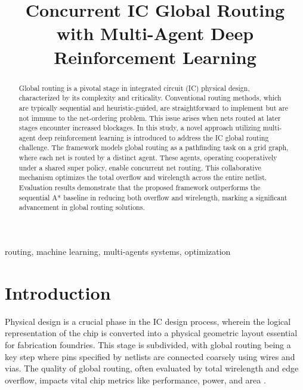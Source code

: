 \documentclass[conference]{IEEEtran}
\begin{document}
\title{Concurrent IC Global Routing with Multi-Agent Deep Reinforcement Learning}

\author{
}

\maketitle

\begin{abstract}
    Global routing is a pivotal stage in integrated circuit (IC) physical design, characterized by its complexity and criticality. Conventional routing methods, which are typically sequential and heuristic-guided, are straightforward to implement but are not immune to the net-ordering problem. This issue arises when nets routed at later stages encounter increased blockages. In this study, a novel approach utilizing multi-agent deep reinforcement learning is introduced to address the IC global routing challenge. The framework models global routing as a pathfinding task on a grid graph, where each net is routed by a distinct agent. These agents, operating cooperatively under a shared super policy, enable concurrent net routing. This collaborative mechanism optimizes the total overflow and wirelength across the entire netlist. Evaluation results demonstrate that the proposed framework outperforms the sequential A* baseline in reducing both overflow and wirelength, marking a significant advancement in global routing solutions.
\end{abstract}

\begin{IEEEkeywords}
    routing, machine learning, multi-agents systems, optimization
\end{IEEEkeywords}

\section{Introduction}
Physical design is a crucial phase in the IC design process, wherein the logical representation of the chip is converted into a physical geometric layout essential for fabrication foundries. This stage is subdivided, with global routing being a key step where pins specified by netlists are connected coarsely using wires and vias. The quality of global routing, often evaluated by total wirelength and edge overflow, impacts vital chip metrics like performance, power, and area \cite{Hu2001}.
\end{document}
